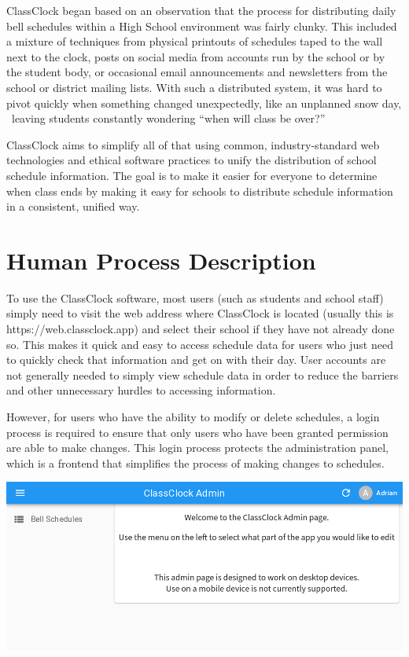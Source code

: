 \documentclass{article}
\begin{document}
{ClassClock began based on an observation that the process for distributing daily bell schedules within a High School
environment was fairly clunky. This included a mixture of techniques from physical printouts of schedules taped to the
wall next to the clock, posts on social media from accounts run by the school or by the student body, or occasional
email announcements and newsletters from the school or district mailing lists. With such a distributed system, it was
hard to pivot quickly when something changed unexpectedly, like an unplanned snow day, \ leaving students constantly
wondering “when will class be over?”}


{ClassClock aims to simplify all of that using common, industry-standard web technologies and ethical software practices
to unify the distribution of school schedule information. The goal is to make it easier for everyone to determine when
class ends by making it easy for schools to distribute schedule information in a consistent, unified way.}

\section{Human Process Description}
{To use the ClassClock software, most users (such as students and school staff) simply need to visit the web address
where ClassClock is located (usually this is https://web.classclock.app) and select their school if they have not
already done so. This makes it quick and easy to access schedule data for users who just need to quickly check that
information and get on with their day. User accounts are not generally needed to simply view schedule data in order to
reduce the barriers and other unnecessary hurdles to accessing information.}

{However, for users who have the ability to modify or delete schedules, a login process is required to ensure that only
users who have been granted permission are able to make changes. This login process protects the administration panel,
which is a frontend that simplifies the process of making changes to schedules.}



\begin{center}
\includegraphics[width=\textwidth]{Mini20Manual-img004.png}
\end{center}
\end{document}
